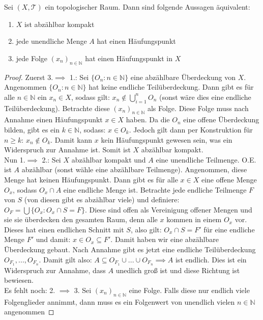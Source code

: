 \documentclass[11pt]{scrartcl}
\begin{document}
\begin{lemma}\label{propCC}
	Sei $(X,\mathcal T)$ ein topologischer Raum. Dann sind folgende Aussagen äquivalent:\begin{enumerate}
		\item $X$ ist abzählbar kompakt
		\item jede unendliche Menge $A$ hat einen Häufungspunkt
		\item jede Folge $(x_n)_{n\in\mathbb N}$ hat einen Häufungspunkt in $X$
	\end{enumerate}
\end{lemma}
\begin{proof}
	Zuerst 3.$\implies$ 1.: Sei $\{O_n: n\in\mathbb N\}$ eine abzählbare Überdeckung von $X$. Angenommen $\{O_n: n\in\mathbb N\}$ hat keine endliche Teilüberdeckung. 
	Dann gibt es für alle $n\in\mathbb N$ ein $x_n \in X$, sodass gilt: $x_n\notin \bigcup_{i=1}^n O_n$ (sonst wäre dies eine endliche Teilüberdeckung). Betrachte diese $(x_n)_{n\in\mathbb N}$ als Folge. 
	Diese Folge muss nach Annahme einen Häufungspunkt $x\in X$ haben. Da die $O_n$ eine offene Überdeckung bilden, gibt es ein $k\in\mathbb N$, sodass: $x\in O_k$. 
	Jedoch gilt dann per Konstruktion für $n\geq k$: $x_n\notin O_k$. Damit kann $x$ kein Häufungspunkt gewesen sein, was ein Widerspruch zur Annahme ist. Somit ist $X$ abzählbar kompakt.\\
	Nun 1.$\implies$ 2.: Sei $X$ abzählbar kompakt und $A$ eine unendliche Teilmenge. O.E. ist $A$ abzählbar (sonst wähle eine abzählbare Teilmenge). Angenommen, diese Menge hat keinen Häufungspunkt. 
	Dann gibt es für alle $x\in X$ eine offene Menge $O_x$, sodass $O_x \cap A$ eine endliche Menge ist. Betrachte jede endliche Teilmenge $F$ von $S$ (von diesen gibt es abzählbar viele) und
	definiere: $O_F = \bigcup \{ O_x : O_x \cap S = F\}$. Diese sind offen als Vereinigung offener Mengen und sie sie überdecken den gesamten Raum, denn alle $x$ kommen in einem $O_x$ vor. Dieses hat 
	einen endlichen Schnitt mit $S$, also gilt: $O_x \cap S = F'$ für eine endliche Menge $F'$ und damit: $x\in O_x \subseteq F'$. Damit haben wir eine abzählbare Überdeckung gebaut. Nach Annahme
	gibt es jetzt eine endliche Teilüberdeckung $O_{F_1},..., O_{F_n}$. Damit gilt also: $A \subseteq O_{F_1} \cup ... \cup O_{F_n} \implies A$ ist endlich. Dies ist ein Widerspruch zur Annahme, dass $A$
	unedlich groß ist und diese Richtung ist bewiesen.\\
	Es fehlt noch: 2. $\implies$ 3. Sei $(x_n)_{n\in\mathbb N}$ eine Folge. Falls diese nur endlich viele Folgenglieder annimmt, dann muss es ein Folgenwert von unendlich vielen $n\in\mathbb N$ angenommen

\end{proof}
\end{document}
